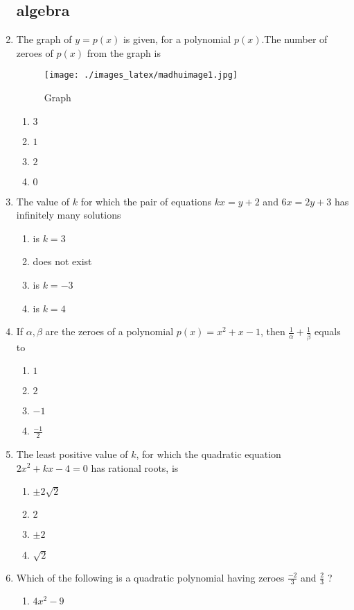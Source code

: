 \documentclass{article}
\begin{document}
\begin{enumerate}
\subsection{algebra}
\item The graph of $y=p(x)$ is given, for a polynomial $p(x)$.The number of zeroes of $p(x)$ from  the graph is 
\begin{figure}[H]  
\centering
\texttt{[image: ./images\_latex/madhuimage1.jpg]} 
\label{fig:fig1}
\caption{Graph }
\end{figure}
\begin{enumerate}[label=(\alph*)]
\item $3$
\item $1$
\item $2$
\item $0$ 
\end{enumerate}
\item The value of $k$ for which the pair of equations $kx=y+2$ and $6x=2y+3$ has infinitely many solutions
\begin{enumerate}
\item is $k=3$
\item does not exist
\item is $k=-3$
\item is $k=4$
\end{enumerate}
\item If $\alpha, \beta$ are the zeroes of a polynomial $p(x) = x^2 + x-1$, then $\frac{1}{\alpha} + \frac{1}{\beta}$ equals to
\begin{enumerate}
\item $1$ 
\item $2$
\item $-1$ 
\item $\frac{-1}{2}$
\end{enumerate}
\item The least positive value of $k$, for which the quadratic equation $2x^2+kx-4=0$ has rational  roots, is 
\begin{enumerate} 
\item $\pm 2\sqrt{2}$ 
\item $2$
\item $\pm 2$
\item $\sqrt{2}$
\end{enumerate}
\item Which of the following is a quadratic polynomial having zeroes $\frac{-2}{3}$ and $\frac{2}{3}$ ?
\begin{enumerate}  
\item $4x^2 - 9$

\end{enumerate}
\end{enumerate}
\end{document}

